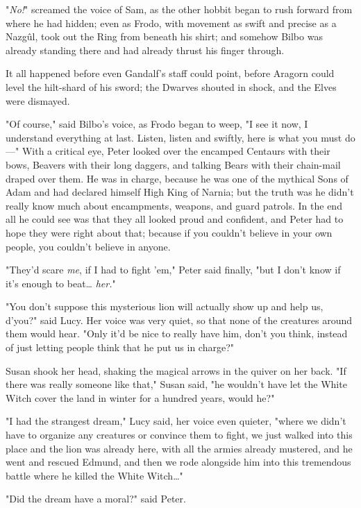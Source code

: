 "\emph{No!}" screamed the voice of Sam, as the other hobbit began to rush 
forward from where he had hidden; even as Frodo, with movement as swift and 
precise as a Nazgûl, took out the Ring from beneath his shirt; and somehow 
Bilbo was already standing there and had already thrust his finger through.

It all happened before even Gandalf's staff could point, before Aragorn could 
level the hilt-shard of his sword; the Dwarves shouted in shock, and the Elves 
were dismayed.

"Of course," said Bilbo's voice, as Frodo began to weep, "I see it now, I 
understand everything at last. Listen, listen and swiftly, here is what you 
must do---"
\sbreak
With a critical eye, Peter looked over the encamped Centaurs with their bows, 
Beavers with their long daggers, and talking Bears with their chain-mail draped 
over them. He was in charge, because he was one of the mythical Sons of Adam 
and had declared himself High King of Narnia; but the truth was he didn't 
really know much about encampments, weapons, and guard patrols. In the end all 
he could see was that they all looked proud and confident, and Peter had to 
hope they were right about that; because if you couldn't believe in your own 
people, you couldn't believe in anyone.

"They'd scare \emph{me}, if I had to fight 'em," Peter said finally, "but I 
don't know if it's enough to beat{\ldots} \emph{her.}"

"You don't suppose this mysterious lion will actually show up and help us, 
d'you?" said Lucy. Her voice was very quiet, so that none of the creatures 
around them would hear. "Only it'd be nice to really have him, don't you think, 
instead of just letting people think that he put us in charge?"

Susan shook her head, shaking the magical arrows in the quiver on her back. "If 
there was really someone like that," Susan said, "he wouldn't have let the 
White Witch cover the land in winter for a hundred years, would he?"

"I had the strangest dream," Lucy said, her voice even quieter, "where we 
didn't have to organize any creatures or convince them to fight, we just walked 
into this place and the lion was already here, with all the armies already 
mustered, and he went and rescued Edmund, and then we rode alongside him into 
this tremendous battle where he killed the White Witch{\ldots}"

"Did the dream have a moral?" said Peter.

